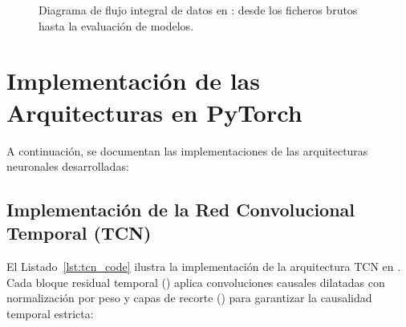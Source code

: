 \begin{figure}[htbp]
    \caption{Diagrama de flujo integral de datos en : desde los ficheros brutos hasta la evaluación de modelos.}
    \label{fig:flujo_libreria_datos}
\end{figure}



\section{Implementación de las Arquitecturas en PyTorch}
\label{sec:soft_modelos}

A continuación, se documentan las implementaciones de las arquitecturas neuronales desarrolladas:

\subsection{Implementación de la Red Convolucional Temporal (TCN)}

El Listado~\ref{lst:tcn_code} ilustra la implementación de la arquitectura TCN en . Cada bloque residual temporal () aplica convoluciones causales dilatadas con normalización por peso y capas de recorte () para garantizar la causalidad temporal estricta:

